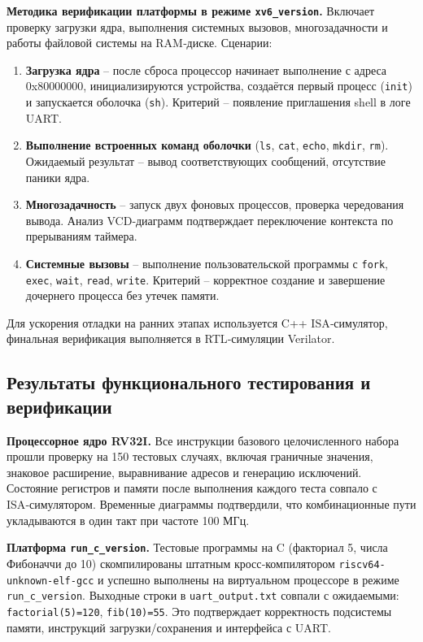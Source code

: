 \textbf{Методика верификации платформы в режиме \texttt{xv6\_version}.} Включает проверку загрузки ядра, выполнения системных вызовов, многозадачности и работы файловой системы на RAM‑диске. Сценарии:
\begin{enumerate}
\item \textbf{Загрузка ядра} – после сброса процессор начинает выполнение с адреса 0x80000000, инициализируются устройства, создаётся первый процесс (\texttt{init}) и запускается оболочка (\texttt{sh}). Критерий – появление приглашения shell в логе UART.
\item \textbf{Выполнение встроенных команд оболочки} (\texttt{ls}, \texttt{cat}, \texttt{echo}, \texttt{mkdir}, \texttt{rm}). Ожидаемый результат – вывод соответствующих сообщений, отсутствие паники ядра.
\item \textbf{Многозадачность} – запуск двух фоновых процессов, проверка чередования вывода. Анализ VCD‑диаграмм подтверждает переключение контекста по прерываниям таймера.
\item \textbf{Системные вызовы} – выполнение пользовательской программы с \texttt{fork}, \texttt{exec}, \texttt{wait}, \texttt{read}, \texttt{write}. Критерий – корректное создание и завершение дочернего процесса без утечек памяти.
\end{enumerate}
Для ускорения отладки на ранних этапах используется C++ ISA‑симулятор, финальная верификация выполняется в RTL‑симуляции Verilator.

\subsection{Результаты функционального тестирования и верификации}

\textbf{Процессорное ядро RV32I.} Все инструкции базового целочисленного набора прошли проверку на 150 тестовых случаях, включая граничные значения, знаковое расширение, выравнивание адресов и генерацию исключений. Состояние регистров и памяти после выполнения каждого теста совпало с ISA‑симулятором. Временные диаграммы подтвердили, что комбинационные пути укладываются в один такт при частоте 100 МГц.

\textbf{Платформа \texttt{run\_c\_version}.} Тестовые программы на C (факториал 5, числа Фибоначчи до 10) скомпилированы штатным кросс‑компилятором \texttt{riscv64-unknown-elf-gcc} и успешно выполнены на виртуальном процессоре в режиме \texttt{run\_c\_version}. Выходные строки в \texttt{uart\_output.txt} совпали с ожидаемыми: \texttt{factorial(5)=120}, \texttt{fib(10)=55}. Это подтверждает корректность подсистемы памяти, инструкций загрузки/сохранения и интерфейса с UART.

